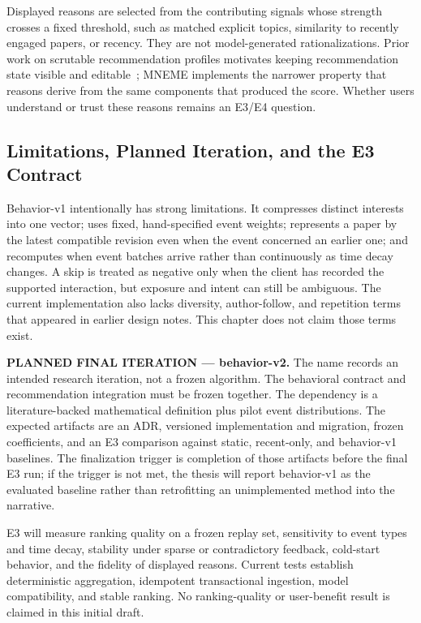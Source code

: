 Displayed reasons are selected from the contributing signals whose strength crosses a fixed threshold, such as matched explicit topics, similarity to recently engaged papers, or recency. They are not model-generated rationalizations. Prior work on scrutable recommendation profiles motivates keeping recommendation state visible and editable~\cite{ramos2024scrutable}; MNEME implements the narrower property that reasons derive from the same components that produced the score. Whether users understand or trust these reasons remains an E3/E4 question.

\subsection{Limitations, Planned Iteration, and the E3 Contract}

Behavior-v1 intentionally has strong limitations. It compresses distinct interests into one vector; uses fixed, hand-specified event weights; represents a paper by the latest compatible revision even when the event concerned an earlier one; and recomputes when event batches arrive rather than continuously as time decay changes. A skip is treated as negative only when the client has recorded the supported interaction, but exposure and intent can still be ambiguous. The current implementation also lacks diversity, author-follow, and repetition terms that appeared in earlier design notes. This chapter does not claim those terms exist.

\textbf{PLANNED FINAL ITERATION --- behavior-v2.} The name records an intended research iteration, not a frozen algorithm. The behavioral contract and recommendation integration must be frozen together. The dependency is a literature-backed mathematical definition plus pilot event distributions. The expected artifacts are an ADR, versioned implementation and migration, frozen coefficients, and an E3 comparison against static, recent-only, and behavior-v1 baselines. The finalization trigger is completion of those artifacts before the final E3 run; if the trigger is not met, the thesis will report behavior-v1 as the evaluated baseline rather than retrofitting an unimplemented method into the narrative.

E3 will measure ranking quality on a frozen replay set, sensitivity to event types and time decay, stability under sparse or contradictory feedback, cold-start behavior, and the fidelity of displayed reasons. Current tests establish deterministic aggregation, idempotent transactional ingestion, model compatibility, and stable ranking. No ranking-quality or user-benefit result is claimed in this initial draft.


